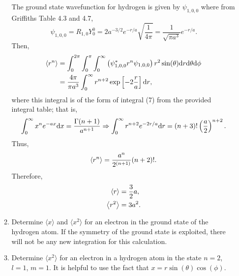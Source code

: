 \documentclass[a4paper, 12pt]{config/homework}
\begin{document}
\begin{enumerate}
\begin{enumerate}[label=(\alph*)]
The ground state wavefunction for hydrogen is given by \(\psi_{1,0,0}\) where from Griffiths Table 4.3 and 4.7,
\[\psi_{1,0,0} = R_{1,0}Y_0^0 = 2a^{-3/2}e^{-r/a}\sqrt{\frac{1}{4\pi}} = \frac{1}{\sqrt{\pi a^3}}e^{-r/a}.\]
Then,
\begin{align*}
\left\langle r^n \right\rangle &= \int_{0}^{2\pi}{\int_{0}^{\pi}{\int_{0}^{\infty}{\left(\psi_{1,0,0}^* r^n \psi_{1,0,0}\right) r^2\sin(\theta) \text{d}r} \text{d}\theta} \text{d}\phi}
\\&= \frac{4\pi}{\pi a^3} \int_{0}^{\infty}{r^{n+2} \exp\left[-2\frac{r}{a}\right] \text{d}r},
\end{align*}
where this integral is of the form of integral (7) from the provided integral table; that is,
\[\int_{0}^{\infty}{x^n e^{-ax} \text{d}x}=\frac{\Gamma(n+1)}{a^{n+1}}
\Rightarrow \int_{0}^{\infty}{r^{n+2} e^{-2r/a} \text{d}r} = (n+3)! \left(\frac{a}{2}\right)^{n+2}.\]
Thus,
\[\left\langle r^n \right\rangle = \frac{a^n}{2^{(n+1)}}(n+2)!.\]
Therefore,
\begin{align*}
\left\langle r \right\rangle &= \frac{3}{2}a, \\
\left\langle r^2 \right\rangle &= 3a^2 .
\end{align*}

\item Determine \(\langle x \rangle\) and \(\langle x^2 \rangle\) for an electron in the ground state of the hydrogen atom. If the symmetry of the ground state is exploited, there will not be any new integration for this calculation. \bigskip



\pagebreak
\item Determine \(\langle x^2 \rangle\) for an electron in a hydrogen atom in the state \(n=2\), \(l=1\), \(m=1\). It is helpful to use the fact that \(x=r\sin(\theta)\cos(\phi)\). \bigskip


\end{enumerate}
\end{enumerate}
\end{document}
